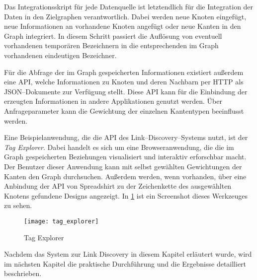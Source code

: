 Das Integrationsskript für jede Datenquelle ist letztendlich für die Integration der Daten in den Zielgraphen verantwortlich. Dabei werden neue Knoten eingefügt, neue Informationen an vorhandene Knoten angefügt oder neue Kanten in den Graph integriert. In diesem Schritt passiert die Auflösung von eventuell vorhandenen temporären Bezeichnern in die entsprechenden im Graph vorhandenen eindeutigen Bezeichner.

Für die Abfrage der im Graph gespeicherten Informationen existiert außerdem eine API, welche Informationen zu Knoten und deren Nachbarn per HTTP als JSON--Dokumente zur Verfügung stellt. Diese API kann für die Einbindung der erzeugten Informationen in andere Applikationen genutzt werden. Über Anfrageparameter kann die Gewichtung der einzelnen Kantentypen beeinflusst werden.

Eine Beispielanwendung, die die API des Link--Discovery--Systems nutzt, ist der \emph{Tag Explorer}. Dabei handelt es sich um eine Browseranwendung, die die im Graph gespeicherten Beziehungen visualisiert und interaktiv erforschbar macht. Der Benutzer dieser Anwendung kann mit selbst gewählten Gewichtungen der Kanten den Graph durchsuchen. Außerdem werden, wenn vorhanden, über eine Anbindung der API von Spreadshirt zu der Zeichenkette des ausgewählten Knotens gefundene Designs angezeigt. In \cref{fig:tag_explorer} ist ein Screenshot dieses Werkzeuges zu sehen.

\begin{figure}
\centering
\texttt{[image: tag\_explorer]}
\caption{Tag Explorer}
\label{fig:tag_explorer}
\end{figure}

Nachdem das System zur Link Discovery in diesem Kapitel erläutert wurde, wird im nächsten Kapitel die praktische Durchführung und die Ergebnisse detailliert beschrieben.